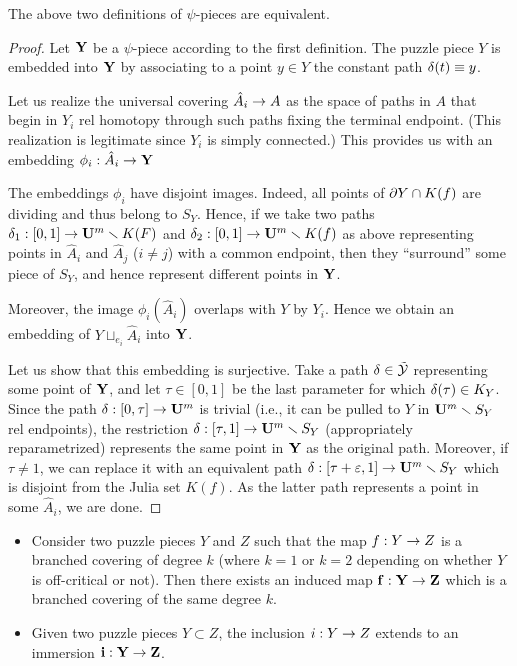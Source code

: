 \begin{lem}
  The above two definitions of $\psi$-pieces are equivalent.
\end{lem}

\begin{proof}
  Let ${\mathbf{Y}}$ be a $\psi$-piece according to the first definition.
The puzzle piece $Y$ is embedded into ${\mathbf{Y}}$ by
associating to a point $y \in Y$ the constant path ${\delta}(t)\equiv y$.

Let us realize the universal covering $\hat A_i\rightarrow A$ as the space of paths
in $A$ that begin in $Y_i$ rel homotopy through such paths fixing the terminal endpoint.
(This realization is legitimate since $Y_i$ is simply connected.)
This provides us with an embedding $\phi_i: \hat A_i\rightarrow {\mathbf{Y}} $

The embeddings $\phi_i$ have disjoint images.
Indeed, all points of $\partial Y\cap K(f)$ are dividing
and thus belong to $S_Y$. Hence, if we take two paths ${\delta}_1: [0,1]\rightarrow {\mathbf{U}}^m\smallsetminus K(F)$
and ${\delta}_2: [0,1]\rightarrow  {\mathbf{U}}^m\smallsetminus K(f)  $ as above
representing points in $\hat A_i$ and $\hat A_j$ ($i\not= j$) with a common endpoint,
then they ``surround'' some piece of $S_Y$, and hence represent different points in ${\mathbf{Y}}$.

Moreover,  the image $\phi_i(\hat A_i)$ overlaps with  $Y$ by $Y_i$.
 Hence we obtain an embedding of $Y\sqcup_{e_i} \hat A_i$ into ${\mathbf{Y}}$.

Let us show that this embedding is surjective.
Take  a path ${\delta}\in \tilde{{\mathcal Y}}$ representing some point of ${\mathbf{Y}}$,
and let $\tau\in [0,1]$ be the last parameter for which ${\delta}(\tau)\in K_Y$.
Since the path ${\delta}: [0,\tau]\rightarrow {\mathbf{U}}^m$ is trivial
(i.e., it can be pulled to $Y$ in ${\mathbf{U}}^m\smallsetminus S_Y$ rel endpoints),
the restriction ${\delta}: [\tau, 1]\rightarrow {\mathbf{U}}^m \smallsetminus S_Y$ (appropriately reparametrized)
represents the same point in ${\mathbf{Y}}$ as the original path.
Moreover, if $\tau\not=1$, we can replace it with an equivalent path
${\delta}: [\tau+{\varepsilon} , 1]\rightarrow {\mathbf{U}}^m \smallsetminus S_Y$
which is disjoint from the Julia set $K(f)$.
As the latter path represents a point in some $\hat A_i$, we are done.
\end{proof}





\begin{lem}\label{psi-maps}
\begin{itemize}
\item [(i)]  Consider two puzzle pieces $Y$ and $Z$ such that the map $f: Y\rightarrow Z$ is a branched covering
of degree $k$ (where $k=1$ or $k=2$ depending on whether $Y$ is off-critical or not).
Then there exists an induced map ${\bf f}: {\mathbf{Y}} \rightarrow {\mathbf{Z}}$
which  is a branched covering of the same degree $k$.


\item [(ii)] Given two puzzle pieces $Y\subset Z$, the inclusion $i: Y\rightarrow Z$ extends to an immersion ${\mathbf{ i}}: {\mathbf{Y}}\rightarrow {\mathbf{Z}}$.
\end{itemize}
\end{lem}

